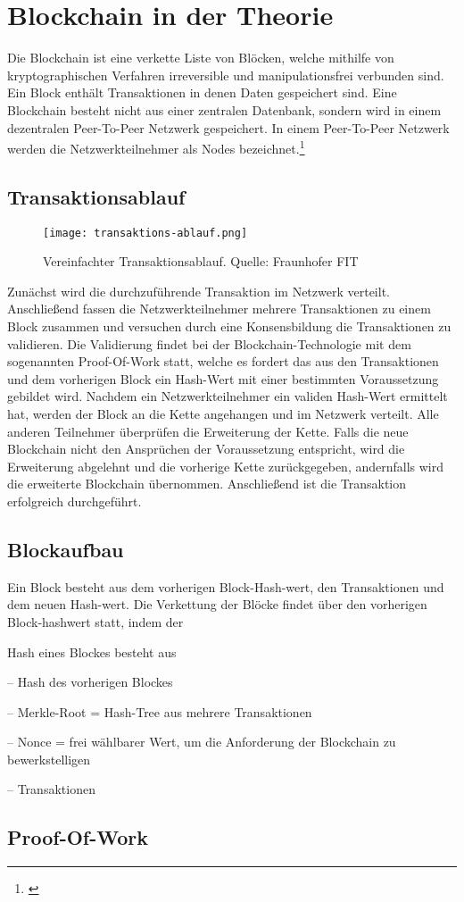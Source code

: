 \section{Blockchain in der Theorie}
\label{sec:Theorie}
Die Blockchain ist eine verkette Liste von Blöcken, welche mithilfe von kryptographischen Verfahren irreversible und manipulationsfrei verbunden sind. Ein Block enthält Transaktionen in denen Daten gespeichert sind. Eine Blockchain besteht nicht aus einer zentralen Datenbank, sondern wird in einem dezentralen Peer-To-Peer Netzwerk gespeichert. In einem Peer-To-Peer Netzwerk werden die Netzwerkteilnehmer als Nodes bezeichnet.\footnote{\cite[S.~5]{Korzun.2013}}


\subsection{Transaktionsablauf}
\label{subsec:transaktionsablauf}

\begin{figure}[h]
	\texttt{[image: transaktions-ablauf.png]}
	\caption{Vereinfachter Transaktionsablauf. Quelle: Fraunhofer FIT}
	\label{fig:transaktionsablauf}
\end{figure}

Zunächst wird die durchzuführende Transaktion im Netzwerk verteilt. Anschließend fassen die Netzwerkteilnehmer mehrere Transaktionen zu einem Block zusammen und versuchen durch eine Konsensbildung die Transaktionen zu validieren. Die Validierung findet bei der Blockchain-Technologie mit dem sogenannten Proof-Of-Work statt, welche es fordert das aus den Transaktionen und dem vorherigen Block ein Hash-Wert mit einer bestimmten Voraussetzung gebildet wird. Nachdem ein Netzwerkteilnehmer ein validen Hash-Wert ermittelt hat, werden der Block an die Kette angehangen und im Netzwerk verteilt. Alle anderen Teilnehmer überprüfen die Erweiterung der Kette. Falls die neue Blockchain nicht den Ansprüchen der Voraussetzung entspricht, wird die Erweiterung abgelehnt und die vorherige Kette zurückgegeben, andernfalls wird die erweiterte Blockchain übernommen. Anschließend ist die Transaktion erfolgreich durchgeführt.


\subsection{Blockaufbau}
\label{subsec:blockaufbau}
Ein Block besteht aus dem vorherigen Block-Hash-wert, den Transaktionen und dem neuen Hash-wert. Die Verkettung der Blöcke findet über den vorherigen Block-hashwert statt, indem der 

Hash eines Blockes besteht aus

-- Hash des vorherigen Blockes

-- Merkle-Root = Hash-Tree aus mehrere Transaktionen

-- Nonce = frei wählbarer Wert, um die Anforderung der Blockchain zu bewerkstelligen



-- Transaktionen

\subsection{Proof-Of-Work}
\label{subsec:proofofwork}
